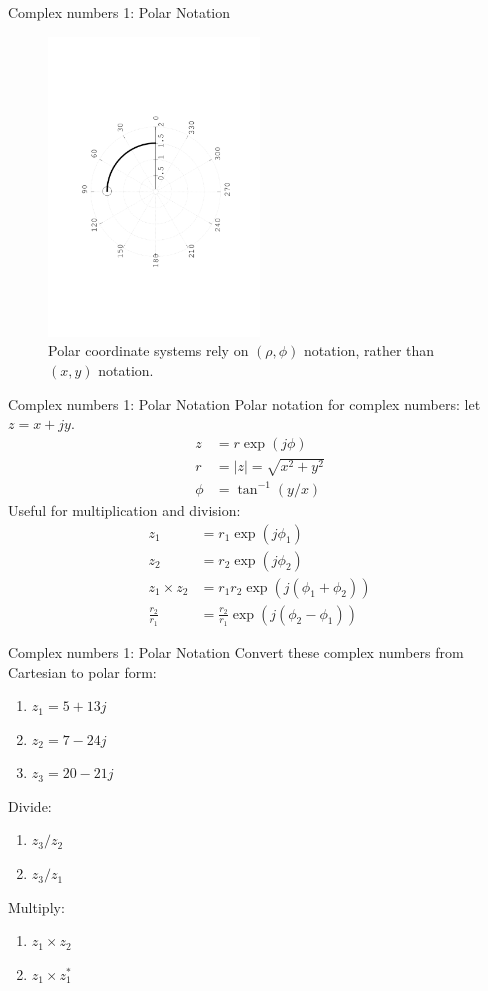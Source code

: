 \documentclass{beamer}
\begin{document}
\begin{frame}{Complex numbers 1: Polar Notation}
\begin{figure}
\centering
\includegraphics[width=0.5\textwidth,angle=270,trim=5cm 3cm 2cm 3cm]{figures/polar.png}
\caption{\label{fig:complex3} Polar coordinate systems rely on $(\rho,\phi)$ notation, rather than $(x,y)$ notation.}
\end{figure}
\end{frame}

\begin{frame}{Complex numbers 1: Polar Notation}
Polar notation for complex numbers: let $z = x+jy$.
\begin{align}
z &= r \exp(j\phi) \\
r &= |z| = \sqrt{x^2 + y^2} \\
\phi &= \tan^{-1}(y/x)
\end{align}
Useful for multiplication and division:
\begin{align}
z_1 &= r_1 \exp(j\phi_1) \\
z_2 &= r_2 \exp(j\phi_2) \\
z_1 \times z_2 &= r_1 r_2 \exp(j(\phi_1 + \phi_2)) \\
\frac{r_2}{r_1} &= \frac{r_2}{r_1} \exp(j(\phi_2 - \phi_1))
\end{align}
\end{frame}

\begin{frame}{Complex numbers 1: Polar Notation}
\small
Convert these complex numbers from Cartesian to polar form:
\begin{enumerate}
\item $z_1 = 5+13j$
\item $z_2 = 7-24j$
\item $z_3 = 20-21j$
\end{enumerate}
Divide:
\begin{enumerate}
\item $z_3/z_2$
\item $z_3/z_1$
\end{enumerate}
Multiply:
\begin{enumerate}
\item $z_1 \times z_2$
\item $z_1 \times z_1^*$
\end{enumerate}
\end{frame}
\end{document}
